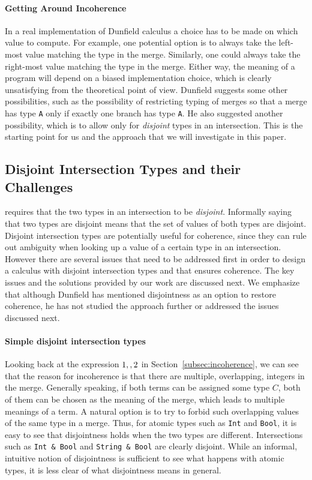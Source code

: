 \paragraph{Getting Around Incoherence}
In a real implementation of Dunfield calculus a choice has to be made
on which value to compute. For example, one potential option is to
always take the left-most value matching the type in the
merge. Similarly, one could always take the right-most value matching
the type in the merge. Either way, the meaning of a program will
depend on a biased implementation choice, which is clearly
unsatisfying from the theoretical point of view.  Dunfield suggests
some other possibilities, such as the possibility of restricting typing
of merges so that a merge has type \lstinline$A$ only if exactly one
branch has type \lstinline$A$. He also suggested another possibility,
which is to allow only for \emph{disjoint} types in an intersection.
This is the starting point for us and the approach that we will 
investigate in this paper. 

\subsection{Disjoint Intersection Types and their Challenges}
\name requires that the
two types in an intersection to be \emph{disjoint}.
Informally saying that two types are disjoint means that the set of
values of both types are disjoint. Disjoint intersection types are
potentially useful for coherence, since they can rule out ambiguity
when looking up a value of a certain type in an intersection. However
there are several issues that need to be addressed first in order to
design a calculus with disjoint intersection types and that ensures
coherence. The key issues and the solutions provided by our work are
discussed next. We emphasize that although Dunfield
has mentioned disjointness as an option to restore coherence, he
has not studied the approach further or addressed the issues discussed next.

\paragraph{Simple disjoint intersection types}
Looking back at the expression $1 ,, 2$ in
Section~\ref{subsec:incoherence}, we can see that the reason for
incoherence is that there are multiple, overlapping, integers in the
merge. Generally speaking, if both terms can be assigned some type
$C$, both of them can be chosen as the meaning of the merge, which
leads to multiple meanings of a term. A natural option is to try
to forbid such overlapping values of the same type in a merge.
Thus, for atomic types such as \lstinline$Int$ and \lstinline$Bool$, it is
easy to see that disjointness holds when the two types are
different. Intersections such as \lstinline$Int & Bool$ and 
\lstinline$String & Bool$ are clearly disjoint.
While an informal, intuitive notion of disjointness is sufficient to
see what happens with atomic types, it is less clear of what
disjointness means in general.


